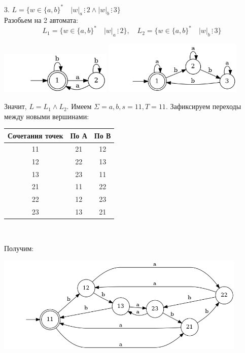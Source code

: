 \documentclass{article}
\begin{document}
    3. $L = \{w \in \{a, b\}^* \quad |w|_a\, \vdots\, 2 \wedge |w|_b\, \vdots\, 3\}$\\
    Разобьем на 2 автомата:
    $$L_1 = \{w \in \{a, b\}^* \quad |w|_a\, \vdots\, 2\}, \quad L_2 = \{w \in \{a, b\}^* \quad |w|_b\, \vdots\, 3\}$$
    \begin{center}
        \includegraphics[width=0.4\textwidth]{pic13.dot}
        \includegraphics[width=0.5\textwidth]{pic14.dot}
    \end{center}
    Значит, $L = L_1 \wedge L_2$. Имеем $\Sigma = {a, b}, s = 11, T = 11$. Зафиксируем переходы между новыми вершинами:
    \begin{center}
        \begin{tabular}{|c|c|c|}
            \hline
            Сочетания точек & По А & По В \\
            \hline
            11 & 21 & 12\\
            12 & 22 & 13\\
            13 & 23 & 11\\
            21 & 11 & 22\\
            22 & 12 & 23\\
            23 & 13 & 21\\
            \hline
        \end{tabular}\\
    \end{center}
    Получим:
    \begin{center}
        \includegraphics[width=0.9\textwidth]{pic15.dot}
    \end{center}
    
    
\end{document}
